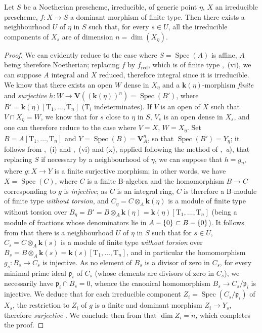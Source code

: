 \begin{corollary}[9.5.6]
\label{IV.9.5.6}
Let $S$ be a Noetherian prescheme, irreducible, of generic point $\eta$, $X$ an irreducible prescheme, $f:X\to S$ a dominant morphism of finite type.
Then there exists a neighbourhood $U$ of $\eta$ in $S$ such that, for every $s\in U$, all the irreducible components of $X_s$ are of dimension $n=\dim(X_\eta)$.
\end{corollary}

\begin{proof}
We can evidently reduce to the case where $S=\operatorname{Spec}(A)$ is affine, $A$ being therefore Noetherian; replacing $f$ by $f_{\mathrm{red}}$, which is of finite type ,~(vi),
we can suppose $A$ integral and $X$ reduced, therefore integral since it is irreducible.
We know  that there exists an open $W$ dense in $X_\eta$ and a $\boldsymbol{k}(\eta)$-morphism \emph{finite} and \emph{surjective} $h:W\to\mathbf{V}((\boldsymbol{k}(\eta))^n)=\operatorname{Spec}(B')$, where $B'=\boldsymbol{k}(\eta)[\mathrm{T}_1,\ldots,\mathrm{T}_n]$ ($\mathrm{T}_i$ indeterminates).
If $V$ is an open of $X$ such that $V\cap X_\eta=W$, we know  that for $s$ close to $\eta$ in $S$, $V_s$ is an open dense in $X_s$, and one can therefore  reduce to the case where $V=X$, $W=X_\eta$.
Set $B=A[\mathrm{T}_1,\ldots,\mathrm{T}_n]$ and $Y=\operatorname{Spec}(B)=\mathbf{V}_A^n$, so that $\operatorname{Spec}(B')=Y_\eta$; it follows from ,~(i) and ,~(vi) and (x), applied following the method of ,~\emph{a}), that replacing $S$ if necessary by a neighbourhood of $\eta$, we can suppose that $h=g_\eta$, where $g:X\to Y$ is a finite surjective morphism; in other words, we have $X=\operatorname{Spec}(C)$, where $C$ is a finite B-algebra and the homomorphism $B\to C$ corresponding to $g$ is \emph{injective}; as $C$ is an integral ring, $C$ is therefore a B-module of finite type \emph{without torsion}, and $C_\eta=C\otimes_A\boldsymbol{k}(\eta)$ is a module of finite type without torsion over $B_\eta=B'=B\otimes_A\boldsymbol{k}(\eta)=\boldsymbol{k}(\eta)[\mathrm{T}_1,\ldots,\mathrm{T}_n]$ (being a module of fractions whose denominators lie in $A-\{0\}\subset B-\{0\}$).
It follows from  that there is a neighbourhood $U$ of $\eta$ in $S$ such that for $s\in U$, $C_s=C\otimes_A\boldsymbol{k}(s)$ is a module of finite type \emph{without torsion} over $B_s=B\otimes_A\boldsymbol{k}(s)=\boldsymbol{k}(s)[\mathrm{T}_1,\ldots,\mathrm{T}_n]$, and in particular the homomorphism $g_s:B_s\to C_s$ is injective.
As no element of $B_s$ is a divisor of zero in $C_s$, for every minimal prime ideal $\mathfrak{p}_i$ of $C_s$ (whose elements are divisors of zero in $C_s$), we necessarily have $\mathfrak{p}_i\cap B_s=0$, whence the canonical homomorphism $B_s\to C_s/\mathfrak{p}_i$ is injective.
We deduce that for each irreducible component $Z_i=\operatorname{Spec}(C_s/\mathfrak{p}_i)$ of $X_s$, the restriction to $Z_i$ of $g$ is a finite and dominant morphism $Z_i\to Y_s$, therefore \emph{surjective} .
We conclude then from  that $\dim Z_i=n$, which completes the proof.
\end{proof}

